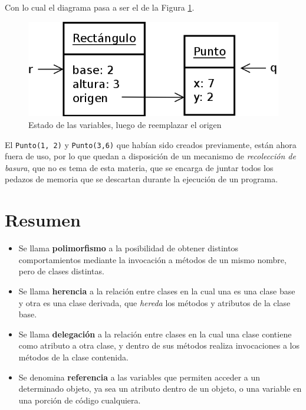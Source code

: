 Con lo cual el diagrama pasa a ser el de la Figura
\ref{rectangulo_punto_b}.

\begin{figure}[htb]
\label{rectangulo_punto_b}
\includegraphics{graficos/15_Rectangulo_Punto_b}
\caption{Estado de las variables, luego de reemplazar el origen}
\end{figure}

\begin{observacion}
El \lstinline!Punto(1, 2)! y \lstinline!Punto(3,6)! que habían sido creados
previamente, están ahora fuera de uso, por lo que quedan a disposición de un
mecanismo de {\it recolección de basura}, que no es tema de esta materia,
que se encarga de juntar todos los pedazos de memoria que se descartan 
durante la ejecución de un programa.
\end{observacion}

\section{Resumen}

\begin{itemize}
\item Se llama {\bf polimorfismo} a la posibilidad de obtener distintos
comportamientos mediante la invocación a métodos de un mismo nombre, pero de
clases distintas.

\item Se llama {\bf herencia} a la relación entre clases en la cual una es una
clase base y otra es una clase derivada, que {\it hereda} los métodos y
atributos de la clase base.

\item Se llama {\bf delegación} a la relación entre clases en la cual una clase
contiene como atributo a otra clase, y dentro de sus métodos realiza
invocaciones a los métodos de la clase contenida.

\item Se denomina {\bf referencia} a las variables que permiten acceder a
un determinado objeto, ya sea un atributo dentro de un objeto, o una
variable en una porción de código cualquiera.
\end{itemize}


